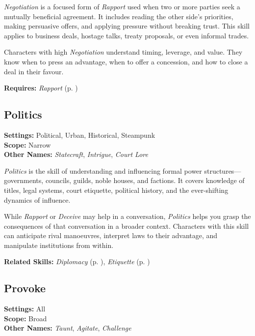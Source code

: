 \emph{Negotiation} is a focused form of \emph{Rapport} used when two or more parties seek a mutually beneficial agreement. It includes reading the other side’s priorities, making persuasive offers, and applying pressure without breaking trust. This skill applies to business deals, hostage talks, treaty proposals, or even informal trades.

Characters with high \emph{Negotiation} understand timing, leverage, and value. They know when to press an advantage, when to offer a concession, and how to close a deal in their favour.

\vspace{0.5\baselineskip}
\noindent\textbf{Requires:} \emph{Rapport} (p. \pageref{skill:rapport})

\subsection{Politics}\label{skill:politics}
\textbf{Settings:} Political, Urban, Historical, Steampunk\\
\textbf{Scope:} Narrow\\
\textbf{Other Names:} \emph{Statecraft}, \emph{Intrigue}, \emph{Court Lore}\\
\vspace{\baselineskip}

\emph{Politics} is the skill of understanding and influencing formal power structures—governments, councils, guilds, noble houses, and factions. It covers knowledge of titles, legal systems, court etiquette, political history, and the ever-shifting dynamics of influence.

While \emph{Rapport} or \emph{Deceive} may help in a conversation, \emph{Politics} helps you grasp the consequences of that conversation in a broader context. Characters with this skill can anticipate rival manoeuvres, interpret laws to their advantage, and manipulate institutions from within.

\vspace{0.5\baselineskip}
\noindent\textbf{Related Skills:} \emph{Diplomacy} (p. \pageref{skill:diplomacy}), \emph{Etiquette} (p. \pageref{skill:etiquette})

\subsection{Provoke}\label{skill:provoke}
\textbf{Settings:} All\\
\textbf{Scope:} Broad\\
\textbf{Other Names:} \emph{Taunt}, \emph{Agitate}, \emph{Challenge}\\
\vspace{\baselineskip}

